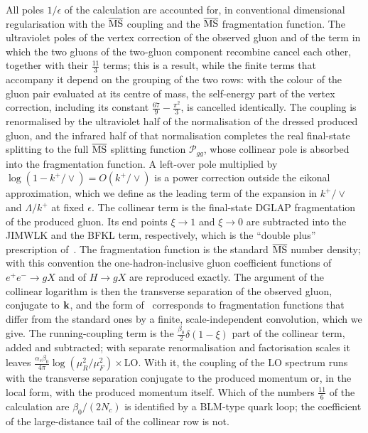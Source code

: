 All poles $1/\epsilon$ of the calculation are accounted for, in conventional dimensional regularisation with the $\overline{\rm MS}$ coupling and the $\overline{\rm MS}$ fragmentation function. The ultraviolet poles of the vertex correction of the observed gluon and of the term in which the two gluons of the two-gluon component recombine cancel each other, together with their $\frac{11}{3}$ terms; this is a result, while the finite terms that accompany it depend on the grouping of the two rows: with the colour of the gluon pair evaluated at its centre of mass, the self-energy part of the vertex correction, including its constant $\frac{67}{9}-\frac{\pi^2}{3}$, is cancelled identically. The coupling is renormalised by the ultraviolet half of the normalisation of the dressed produced gluon, and the infrared half of that normalisation completes the real final-state splitting to the full $\overline{\rm MS}$ splitting function $\mathcal P_{gg}$, whose collinear pole is absorbed into the fragmentation function. A left-over pole multiplied by $\log(1-k^+/\vee)=O(k^+/\vee)$ is a power correction outside the eikonal approximation, which we define as the leading term of the expansion in $k^+/\vee$ and $\Lambda/k^+$ at fixed $\epsilon$. The collinear term is the final-state DGLAP fragmentation of the produced gluon. Its end points $\xi\to1$ and $\xi\to0$ are subtracted into the JIMWLK and the BFKL term, respectively, which is the ``double plus'' prescription of~\cite{Kovner:2023vsy}. The fragmentation function is the standard $\overline{\rm MS}$ number density; with this convention the one-hadron-inclusive gluon coefficient functions of $e^+e^-\to gX$ and of $H\to gX$ are reproduced exactly. The argument of the collinear logarithm is then the transverse separation of the observed gluon, conjugate to $\mathbf{k}$, and the form of~\cite{Chirilli:2012jd} corresponds to fragmentation functions that differ from the standard ones by a finite, scale-independent convolution, which we give. The running-coupling term is the $\frac{\beta_0}{2}\delta(1-\xi)$ part of the collinear term, added and subtracted; with separate renormalisation and factorisation scales it leaves $\frac{\alpha_s\beta_0}{4\pi}\log(\mu_R^2/\mu_F^2)\times$LO. With it, the coupling of the LO spectrum runs with the transverse separation conjugate to the produced momentum or, in the local form, with the produced momentum itself. Which of the numbers $\frac{11}{6}$ of the calculation are $\beta_0/(2N_c)$ is identified by a BLM-type quark loop; the coefficient of the large-distance tail of the collinear row is not.

